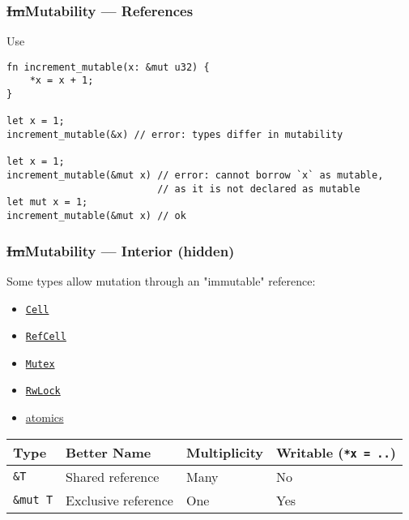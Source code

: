 \documentclass[t]{beamer}
\begin{document}
\begin{frame}[c,fragile]
\frametitle{\st{Im}Mutability --- References}

\begin{block}{Use}
\small
\begin{verbatim}
fn increment_mutable(x: &mut u32) {
    *x = x + 1;
}

let x = 1;
increment_mutable(&x) // error: types differ in mutability

let x = 1;
increment_mutable(&mut x) // error: cannot borrow `x` as mutable,
                          // as it is not declared as mutable
let mut x = 1;
increment_mutable(&mut x) // ok
\end{verbatim}
\end{block}

\end{frame}


\begin{frame}[fragile]
\frametitle{\st{Im}Mutability --- Interior (hidden)}

Some types allow mutation through an "immutable" reference:

\begin{itemize}
\item \href{https://doc.rust-lang.org/std/cell/struct.Cell.html}{\texttt{Cell}}
\item \href{https://doc.rust-lang.org/std/cell/struct.RefCell.html}{\texttt{RefCell}}
\item \href{https://doc.rust-lang.org/std/sync/struct.Mutex.html}{\texttt{Mutex}}
\item \href{https://doc.rust-lang.org/std/sync/struct.RwLock.html}{\texttt{RwLock}}
\item \href{https://doc.rust-lang.org/std/sync/atomic/}{atomics}
\end{itemize}

\bigskip

\begin{tabular}{l l l l}
Type & Better Name & Multiplicity & Writable (\texttt{*x = ..}) \\
\hline
\texttt{\&T} & Shared reference & Many & No \\
\texttt{\&mut T} & Exclusive reference & One & Yes
\end{tabular}

\end{frame}
\end{document}

